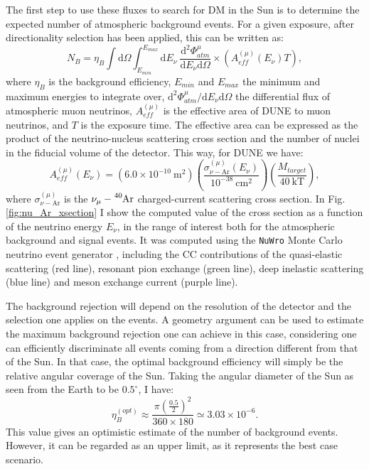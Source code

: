 The first step to use these fluxes to search for DM in the Sun is to determine the expected number of atmospheric background events. For a given exposure, after directionality selection has been applied, this can be written as:
\begin{equation}\label{4.1}
	N_{B} = \eta_{B} \int \mathrm{d}\Omega \int_{E_{min}}^{E_{max}} \mathrm{d}E_{\nu} \ \frac{\mathrm{d}^{2}\Phi_{atm}^{\mu}}{\mathrm{d}E_{\nu} \mathrm{d}\Omega} \times \left(A_{eff}^{(\mu)}(E_{\nu}) T\right),
\end{equation}
where $\eta_{B}$ is the background efficiency, $E_{min}$ and $E_{max}$ the minimum and maximum energies to integrate over, $\mathrm{d}^{2}\Phi_{atm}^{\mu} / \mathrm{d}E_{\nu} \mathrm{d}\Omega$ the differential flux of atmospheric muon neutrinos, $A_{eff}^{(\mu)}$ is the effective area of DUNE to muon neutrinos, and $T$ is the exposure time. The effective area can be expressed as the product of the neutrino-nucleus scattering cross section and the number of nuclei in the fiducial volume of the detector. This way, for DUNE we have:
\begin{equation}\label{4.2}
	A_{eff}^{(\mu)}(E_{\nu}) = (6.0 \times 10^{-10} \ \mathrm{m}^{2}) \left(\frac{\sigma_{\nu - \mathrm{Ar}}^{(\mu)}(E_{\nu})}{10^{-38} \ \mathrm{cm}^{2}}\right) \left(\frac{M_{target}}{40 \ \mathrm{kT}}\right),
\end{equation}
where $\sigma_{\nu - \mathrm{Ar}}^{(\mu)}$ is the $\nu_{\mu}-\ce{^{40}Ar}$ charged-current scattering cross section. In Fig. \ref{fig:nu_Ar_xsection} I show the computed value of the cross section as a function of the neutrino energy $E_{\nu}$, in the range of interest both for the atmospheric background and signal events. It was computed using the \texttt{NuWro} Monte Carlo neutrino event generator \cite{Golan2012}, including the CC contributions of the quasi-elastic scattering (red line), resonant pion exchange (green line), deep inelastic scattering (blue line) and meson exchange current (purple line).

The background rejection will depend on the resolution of the detector and the selection one applies on the events. A geometry argument can be used to estimate the maximum background rejection one can achieve in this case, considering one can efficiently discriminate all events coming from a direction different from that of the Sun. In that case, the optimal background efficiency will simply be the relative angular coverage of the Sun. Taking the angular diameter of the Sun as seen from the Earth to be $0.5^{\circ}$, I have:
\begin{equation}\label{4.3}
	\eta_{B}^{(opt)} \approx \frac{\pi \left(\frac{0.5}{2}\right)^{2}}{360 \times 180} \simeq 3.03 \times 10^{-6}.
\end{equation}
This value gives an optimistic estimate of the number of background events. However, it can be regarded as an upper limit, as it represents the best case scenario.

